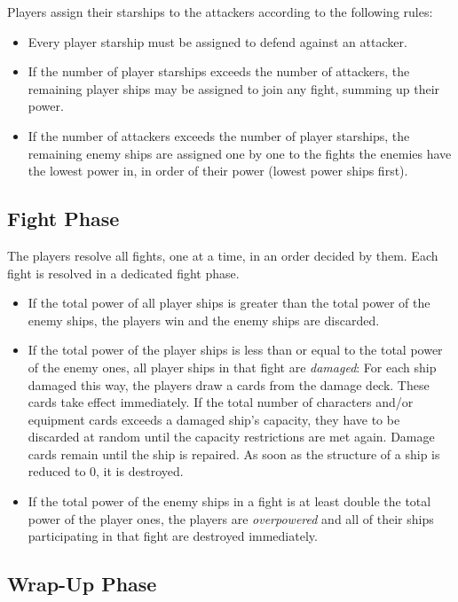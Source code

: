 \documentclass[11pt, a4paper]{article}
\begin{document}
Players assign their starships to the attackers according to the following
rules:

\begin{itemize}
 \item Every player starship must be assigned to defend against an attacker.
 \item If the number of player starships exceeds the number of attackers, the
remaining player ships may be assigned to join any fight, summing up their
power.
 \item If the number of attackers exceeds the number of player starships, the
remaining enemy ships are assigned one by one to the fights the enemies have
the lowest power in, in order of their power (lowest power ships first).
\end{itemize}

\subsection{Fight Phase}

The players resolve all fights, one at a time, in an order decided by them.
Each fight is resolved in a dedicated fight phase.

\begin{itemize}
 \item If the total power of all player ships is greater than the total power of
the enemy ships, the players win and the enemy ships are discarded.
 \item If the total power of the player ships is less than or equal to the total
power of the enemy ones, all player ships in that fight are \emph{damaged}: For
each ship damaged this way, the players draw a cards from the damage deck.
These cards take effect immediately. If the total number of characters and/or
equipment cards exceeds a damaged ship's capacity, they have to be discarded at
random until the capacity restrictions are met again. Damage cards remain until
the ship is repaired. As soon as the structure of a ship is reduced to 0, it is
destroyed.
 \item If the total power of the enemy ships in a fight is at least double the
total power of the player ones, the players are \emph{overpowered} and all of
their ships participating in that fight are destroyed immediately.
\end{itemize}

\subsection{Wrap-Up Phase}
\end{document}
